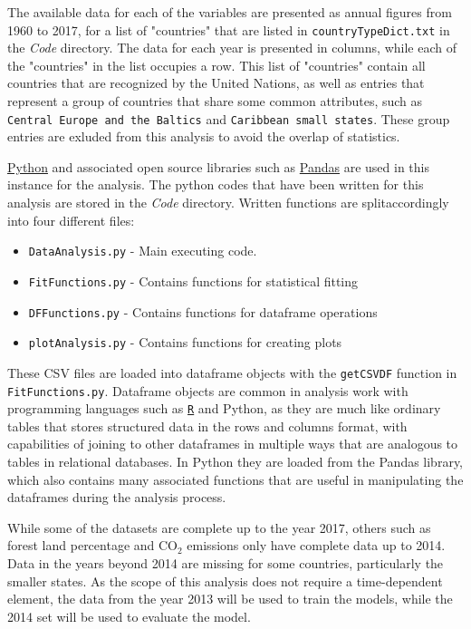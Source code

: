 \documentclass[11pt,a4paper,titlepage]{article}
\newcommand{\blankline}{\quad\pagebreak[2]}
\begin{document}
\blankline

The available data for each of the variables are presented as annual figures from 1960 to 2017, for a list of "countries" that are listed in \texttt{countryTypeDict.txt} in the \textit{Code} directory. The data for each year is presented in columns, while each of the "countries" in the list occupies a row. This list of "countries" contain all countries that are recognized by the United Nations, as well as entries that represent a group of countries that share some common attributes, such as \texttt{Central Europe and the Baltics} and \texttt{Caribbean small states}. These group entries are exluded from this analysis to avoid the overlap of statistics.

\href{https://www.python.org/}{Python} and associated open source libraries such as \href{https://pandas.pydata.org/}{Pandas} are used in this instance for the analysis. The python codes that have been written for this analysis are stored in the \textit{Code} directory. Written functions are splitaccordingly into four different files:

\begin{itemize}
    \item \texttt{DataAnalysis.py} - Main executing code.
    \item \texttt{FitFunctions.py} - Contains functions for statistical fitting
    \item \texttt{DFFunctions.py} - Contains functions for dataframe operations
    \item \texttt{plotAnalysis.py} - Contains functions for creating plots
\end{itemize}

These CSV files are loaded into dataframe objects with the \texttt{getCSVDF} function in \texttt{FitFunctions.py}. Dataframe objects are common in analysis work with programming languages such as \href{https://www.r-project.org/}{\texttt{R}} and Python, as they are much like ordinary tables that stores structured data in the rows and columns format, with capabilities of joining to other dataframes in multiple ways that are analogous to tables in relational databases. In Python they are loaded from the Pandas library, which also contains many associated functions that are useful in manipulating the dataframes during the analysis process. 

While some of the datasets are complete up to the year 2017, others such as forest land percentage and CO$_{2}$ emissions only have complete data up to 2014. Data in the years beyond 2014 are missing for some countries, particularly the smaller states. As the scope of this analysis does not require a time-dependent element, the data from the year 2013 will be used to train the models, while the 2014 set will be used to evaluate the model.
\end{document}
